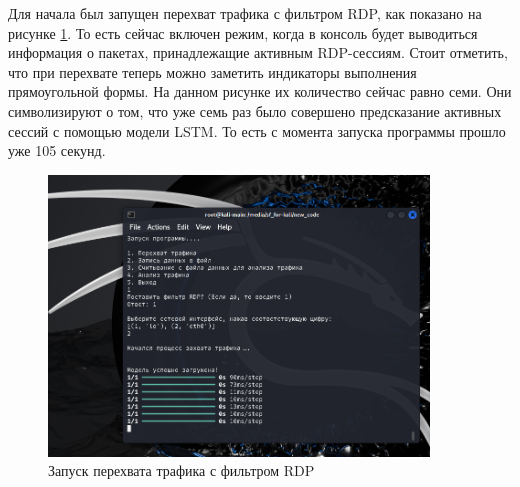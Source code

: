 \documentclass[spec, och, diploma]{SCWorks}
\begin{document}
Для начала был запущен перехват трафика с фильтром RDP, как показано на рисунке \ref{main1}. То есть сейчас включен режим, когда в консоль 
будет выводиться информация о пакетах, принадлежащие активным RDP-сессиям. Стоит отметить, что при перехвате теперь можно заметить индикаторы выполнения прямоугольной
формы. На данном рисунке их количество сейчас равно семи. Они символизируют о том, что уже семь раз было совершено предсказание активных 
сессий с помощью модели LSTM. То есть с момента запуска программы прошло уже 105 секунд.

\begin{figure}[H]
  \centering
  \includegraphics[width=0.9\textwidth]{pics/main-view.png}
  \caption{Запуск перехвата трафика с фильтром RDP}
  \label{main1}
\end{figure}





\end{document}

